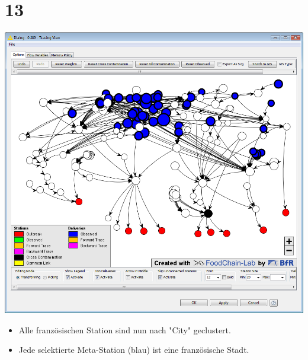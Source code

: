 \documentclass{beamer}
\begin{document}
\section{13}
\begin{frame}
	\begin{center}
  		\includegraphics[height=0.6\textheight]{13.png}
	\end{center}
	\begin{itemize}
		\item Alle französischen Station sind nun nach "City" geclustert.
		\item Jede selektierte Meta-Station (blau) ist eine französische Stadt.
	\end{itemize}
\end{frame}
\end{document}
